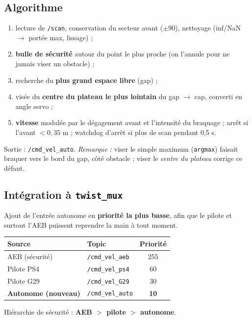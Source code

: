 \documentclass[a4paper,11pt]{article}
\begin{document}
\subsection{Algorithme}
\begin{enumerate}[leftmargin=1.6em]
  \item lecture de \texttt{/scan}, conservation du secteur avant ($\pm$90\textdegree),
        nettoyage (inf/NaN $\rightarrow$ portée max, lissage) ;
  \item \textbf{bulle de sécurité} autour du point le plus proche (on l'annule
        pour ne jamais viser un obstacle) ;
  \item recherche du \textbf{plus grand espace libre} (gap) ;
  \item visée du \textbf{centre du plateau le plus lointain} du gap $\rightarrow$
        cap, converti en angle servo ;
  \item \textbf{vitesse} modulée par le dégagement avant et l'intensité du
        braquage ; arrêt si l'avant $<0{,}35$ m ; watchdog d'arrêt si plus de scan
        pendant 0,5 s.
\end{enumerate}
Sortie : \texttt{/cmd\_vel\_auto}. \emph{Remarque :} viser le simple maximum
(\texttt{argmax}) faisait braquer vers le bord du gap, côté obstacle ; viser le
\emph{centre du plateau} corrige ce défaut.

\subsection{Intégration à \texttt{twist\_mux}}\label{sec:mux}
Ajout de l'entrée autonome en \textbf{priorité la plus basse}, afin que le pilote
et surtout l'AEB puissent reprendre la main à tout moment.
\begin{center}
\begin{tabular}{@{}llc@{}}
\toprule
Source & Topic & Priorité \\
\midrule
AEB (sécurité)          & \texttt{/cmd\_vel\_aeb}  & 255 \\
Pilote PS4              & \texttt{/cmd\_vel\_ps4}  & 60 \\
Pilote G29             & \texttt{/cmd\_vel\_G29}  & 30 \\
\textbf{Autonome (nouveau)} & \texttt{/cmd\_vel\_auto} & \textbf{10} \\
\bottomrule
\end{tabular}
\end{center}
Hiérarchie de sécurité : \textbf{AEB $>$ pilote $>$ autonome}.
\end{document}
